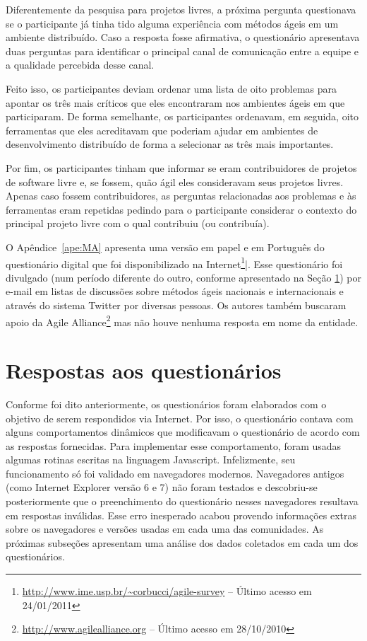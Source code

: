 Diferentemente da pesquisa para projetos livres, a próxima pergunta
questionava se o participante já tinha tido alguma experiência com
métodos ágeis em um ambiente distribuído. Caso a resposta fosse
afirmativa, o questionário apresentava duas perguntas para identificar
o principal canal de comunicação entre a equipe e a qualidade
percebida desse canal.

Feito isso, os participantes deviam ordenar uma lista de oito
problemas para apontar os três mais críticos que eles encontraram nos
ambientes ágeis em que participaram. De forma semelhante, os
participantes ordenavam, em seguida, oito ferramentas que eles
acreditavam que poderiam ajudar em ambientes de desenvolvimento
distribuído de forma a selecionar as três mais importantes.

Por fim, os participantes tinham que informar se eram contribuidores
de projetos de software livre e, se fossem, quão ágil eles
consideravam seus projetos livres. Apenas caso fossem contribuidores,
as perguntas relacionadas aos problemas e às ferramentas eram
repetidas pedindo para o participante considerar o contexto do
principal projeto livre com o qual contribuiu (ou contribuía).

O Apêndice~\ref{ape:MA} apresenta uma versão em papel e em Português
do questionário digital que foi disponibilizado na
Internet\footnote{\url{http://www.ime.usp.br/~corbucci/agile-survey}
  -- Último acesso em 24/01/2011}|. Esse questionário foi divulgado
(num período diferente do outro, conforme apresentado na Seção
\ref{sec:respostas}) por e-mail em listas de discussões sobre métodos
ágeis nacionais e internacionais e através do sistema Twitter por
diversas pessoas. Os autores também buscaram apoio da Agile
Alliance\footnote{\url{http://www.agilealliance.org} -- Último acesso
  em 28/10/2010} mas não houve nenhuma resposta em nome da entidade.

\section{Respostas aos questionários}
\label{sec:respostas}


Conforme foi dito anteriormente, os questionários foram elaborados com
o objetivo de serem respondidos via Internet. Por isso, o questionário
contava com alguns comportamentos dinâmicos que modificavam o
questionário de acordo com as respostas fornecidas. Para implementar
esse comportamento, foram usadas algumas rotinas escritas na linguagem
Javascript. Infelizmente, seu funcionamento só foi validado em
navegadores modernos. Navegadores antigos (como Internet Explorer
versão 6 e 7) não foram testados e descobriu-se posteriormente que o
preenchimento do questionário nesses navegadores resultava em
respostas inválidas. Esse erro inesperado acabou provendo informações
extras sobre os navegadores e versões usadas em cada uma das
comunidades. As próximas subseções apresentam uma análise dos dados
coletados em cada um dos questionários.

